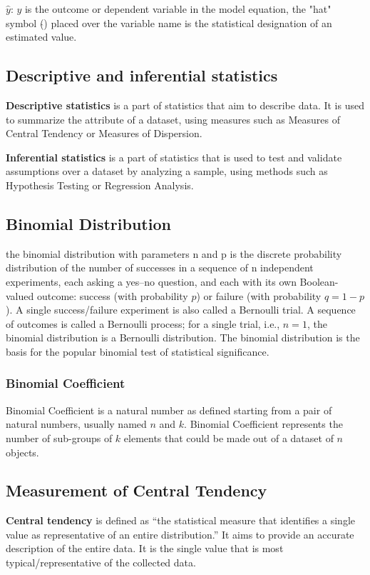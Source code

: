 \documentclass{article}
\begin{document}
$\hat{y}$: $y$ is the outcome or dependent variable in the model equation, the "hat" symbol ($\hat{}$) placed over the variable name is the statistical designation of an estimated value.


\subsection{Descriptive and inferential statistics}

\textbf{Descriptive statistics} is a part of statistics that aim to describe data. It is used to summarize the attribute of a dataset, using measures such as Measures of Central Tendency or Measures of Dispersion.

\textbf{Inferential statistics} is a part of statistics that is used to test and validate assumptions over a dataset by analyzing a sample, using methods such as Hypothesis Testing or Regression Analysis.

\subsection{Binomial Distribution}
the binomial distribution with parameters n and p is the discrete probability distribution of the number of successes in a sequence of n independent experiments, each asking a yes–no question, and each with its own Boolean-valued outcome: success (with probability $p$) or failure (with probability $q=1-p$). 
A single success/failure experiment is also called a Bernoulli trial. 
A sequence of outcomes is called a Bernoulli process; for a single trial, i.e., $n = 1$, the binomial distribution is a Bernoulli distribution. 
The binomial distribution is the basis for the popular binomial test of statistical significance.

\subsubsection{Binomial Coefficient}
Binomial Coefficient is a natural number as defined starting from a pair of natural numbers, usually named $n$ and $k$. 
Binomial Coefficient represents the number of sub-groups of $k$ elements that could be made out of a dataset of $n$ objects.

\subsection{Measurement of Central Tendency}
\textbf{Central tendency} is defined as “the statistical measure that identifies a single value as representative of an entire distribution.” It aims to provide an accurate description of the entire data. It is the single value that is most typical/representative of the collected data.
\end{document}
